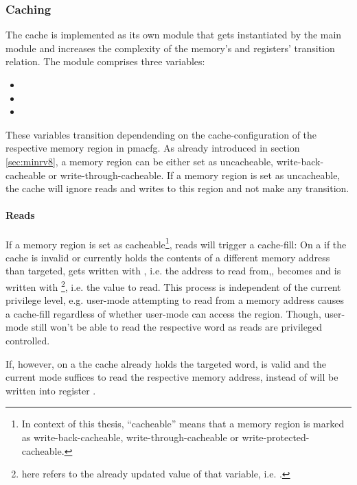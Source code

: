 \subsubsection{Caching}
\label{sec:implementation-caching}

The cache is implemented as its own module that gets instantiated by the main module and increases the complexity of the memory's and registers' transition relation.
The module comprises three variables:
\begin{itemize}
    \item {}
    \item {}
    \item {}
\end{itemize}

These variables transition dependending on the cache-configuration of the respective memory region in \gls{pmacfg}.
As already introduced in section \ref{sec:minrv8}, a memory region can be either set as uncacheable, write-back-cacheable or write-through-cacheable.
If a memory region is set as uncacheable, the cache will ignore reads and writes to this region and not make any transition.

\paragraph{Reads}
If a memory region is set as cacheable\footnote{%
    In context of this thesis, \enquote{cacheable} means that a memory region is marked as write-back-cacheable, write-through-cacheable or write-protected-cacheable.
}, reads will trigger a cache-fill:
On a  if the cache is invalid or currently holds the contents of a different memory address than targeted,  gets written with , i.e. the address to read from,,  becomes  and  is written with \footnote{%
     here refers to the already updated value of that variable, i.e. .
}, i.e. the value to read.
This process is independent of the current privilege level, e.g. user-mode attempting to read from a memory address causes a cache-fill regardless of whether user-mode can access the region.
Though, user-mode still won't be able to read the respective word as reads are privileged controlled.

If, however, on a  the cache already holds the targeted word, is valid and the current mode suffices to read the respective memory address,  instead of  will be written into register .

